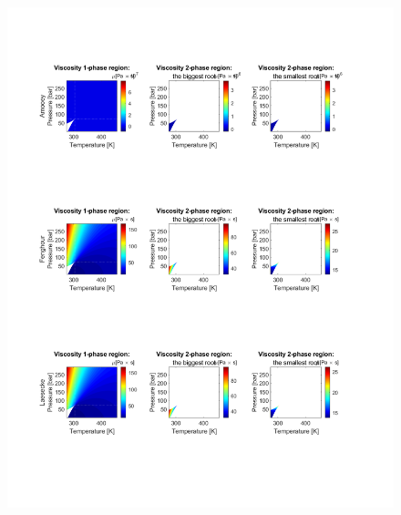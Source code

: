 \documentclass[../Article_Model_Parameters.tex]{subfiles}
\begin{document}

        \begin{figure}[H]
			\centering
			\includegraphics[trim = 1.5cm 11.5cm 2.5cm 10.0cm,clip,width=\textwidth]{Figures/MU.pdf}	

\end{figure}
\end{document}
